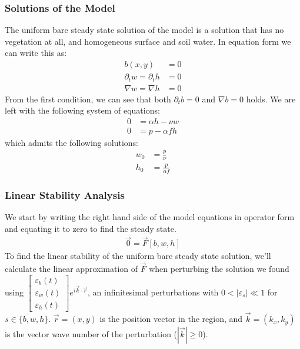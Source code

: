 \documentclass{article}
\numberwithin{equation}{section}
\begin{document}
\subsubsection{Solutions of the Model}
The uniform bare steady state solution of the model is a solution that has no vegetation at all, and homogeneous surface and soil water. In equation form we can write this as:
\begin{align}
    b(x,y)                      & =0  \\
    \partial_t w = \partial_t h & = 0 \\
    \nabla w = \nabla h         & = 0
\end{align}
From the first condition, we can see that both $\partial_tb=0$ and $\nabla b=0$ holds. We are left with the following system of equations:
\begin{align}
    0 & = \alpha h - \nu w \\
    0 & = p-\alpha f h
\end{align}
which admits the following solutions:
\begin{align}
    w_0 & = \frac{p}{\nu}      \\
    h_0 & = \frac{p}{\alpha f}
\end{align}
\subsubsection{Linear Stability Analysis}
We start by writing the right hand side of the model equations in operator form and equating it to zero to find the steady state.
\begin{align}\label{eqn:functional_eq}
    \vec{0}=\vec{F}[b,w,h]
\end{align}
To find the linear stability of the uniform bare steady state solution, we'll calculate the linear approximation of $\vec{F}$  when perturbing the solution we found using $\begin{bmatrix}
        \varepsilon_b(t) \\ \varepsilon_w(t) \\ \varepsilon_h(t)
    \end{bmatrix}e^{i\vec{k}\cdot\vec{r}}$, an infinitesimal perturbations with $0<|\varepsilon_s|\ll1$ for $s\in \{b,w,h\}$.  $\vec{r}=(x,y)$ is the position vector in the region, and $\vec{k}=(k_x,k_y)$ is the vector wave number of the perturbation ($|\vec{k}|\geq 0$).
\end{document}
